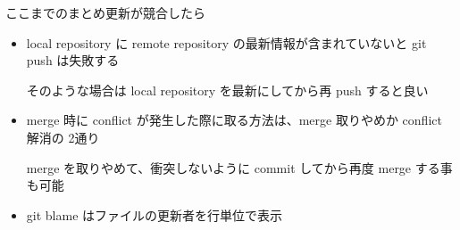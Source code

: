 
\begin{frame}[t]{ここまでのまとめ}{更新が競合したら}

  \begin{itemize}
  \item local repository に remote repository の最新情報が含まれていないと git push は失敗する

    そのような場合は local repository を最新にしてから再 push すると良い
    \vspace{2ex}

  \item merge 時に conflict が発生した際に取る方法は、merge 取りやめか conflict 解消の 2通り

    merge を取りやめて、衝突しないように commit してから再度 merge する事も可能
    \vspace{2ex}

  \item git blame はファイルの更新者を行単位で表示
  \end{itemize}

\end{frame}
